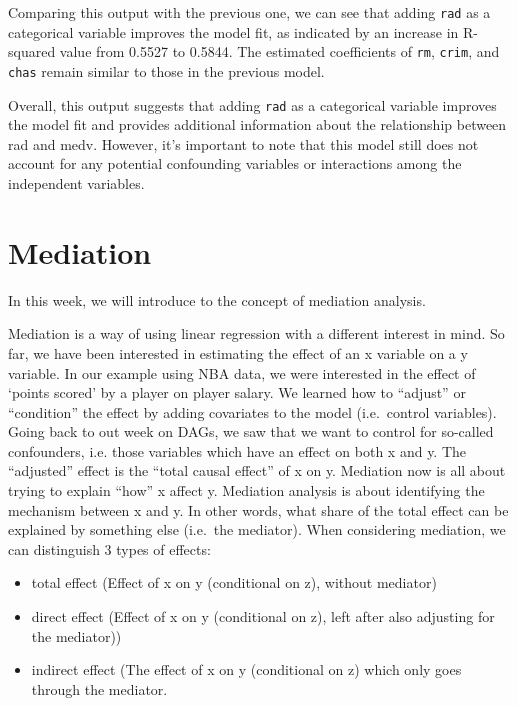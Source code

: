 \documentclass[
]{book}
\providecommand{\tightlist}{%
  \setlength{\itemsep}{0pt}\setlength{\parskip}{0pt}}
\begin{document}
Comparing this output with the previous one, we can see that adding \texttt{rad} as a categorical variable improves the model fit, as indicated by an increase in R-squared value from 0.5527 to 0.5844. The estimated coefficients of \texttt{rm}, \texttt{crim}, and \texttt{chas} remain similar to those in the previous model.

Overall, this output suggests that adding \texttt{rad} as a categorical variable improves the model fit and provides additional information about the relationship between rad and medv. However, it's important to note that this model still does not account for any potential confounding variables or interactions among the independent variables.

\hypertarget{med}{%
\chapter{Mediation}\label{med}}

In this week, we will introduce to the concept of mediation analysis.

Mediation is a way of using linear regression with a different interest in mind.
So far, we have been interested in estimating the effect of an x variable on a
y variable. In our example using NBA data, we were interested in the effect of
`points scored' by a player on player salary. We learned how to ``adjust'' or ``condition''
the effect by adding covariates to the model (i.e.~control variables). Going back to
out week on DAGs, we saw that we want to control for so-called confounders, i.e.
those variables which have an effect on both x and y. The ``adjusted'' effect is the
``total causal effect'' of x on y.
Mediation now is all about trying to explain ``how'' x affect y. Mediation analysis
is about identifying the mechanism between x and y. In other words, what share
of the total effect can be explained by something else (i.e.~the mediator). When
considering mediation, we can distinguish 3 types of effects:

\begin{itemize}
\tightlist
\item
  total effect (Effect of x on y (conditional on z), without mediator)
\item
  direct effect (Effect of x on y (conditional on z), left after also adjusting for the mediator))
\item
  indirect effect (The effect of x on y (conditional on z) which only goes through the mediator.
\end{itemize}
\end{document}
